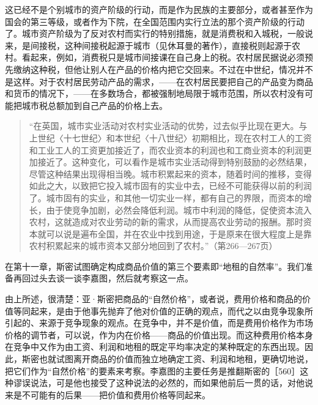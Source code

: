 这已经不是个别城市的资产阶级的行动，而是作为民族的主要部分，或者甚至作为国会的第三等级，或者作为下院，在全国范围内实行立法的那个资产阶级的行动了。城市资产阶级为了反对农村而实行的特别措施，就是消费税和入城税，一般说来，是间接税，这种间接税起源于城市（见休耳曼的著作），直接税则起源于农村。看起来，例如，消费税只是城市间接课在自己身上的税。农村居民据说必须预先缴纳这种税，但他让别人在产品的价格内把它交回来。不过在中世纪，情况并不是这样。对于农村居民劳动产品的需求，——在农村居民要把自己的产品变为商品和货币的情况下，——在多数场合，都被强制地局限于城市范围，所以农村没有可能把城市税总额加到自己产品的价格上去。

\begin{quote}{“在英国，城市实业活动对农村实业活动的优势，过去似乎比现在更大。与上世纪〈十七世纪〉和本世纪〈十八世纪〉初期相比，现在农村工人的工资和工业工人的工资更加接近了，而农业资本的利润也和工商业资本的利润更加接近了。这种变化，可以看作是城市实业活动得到特别鼓励的必然结果，尽管这种结果出现得相当晚。城市积累起来的资本，随着时间的推移，变得如此之大，以致把它投入城市固有的实业中去，已经不可能获得以前的利润了。城市固有的实业，和其他一切实业一样，都有自己的界限，而资本的增长，由于使竞争加剧，必然会降低利润。城市中利润的降低，促使资本流入农村，这就造成对农业劳动的新的需求，从而提高农业劳动的报酬。那时资本就可以说是遍布全国，并在农业中找到用途，于是原来在很大程度上是靠农村积累起来的城市资本又部分地回到了农村。”（第266—267页）}\end{quote}

在第十一章，斯密试图确定构成商品价值的第三个要素即“地租的自然率”。我们准备再回过头去谈一谈李嘉图，然后就考察这一点。

由上所述，很清楚：亚·斯密把商品的“自然价格”，或者说，费用价格和商品的价值等同起来，是由于他事先抛弃了他对价值的正确的观点，而代之以由竞争现象所引起的、来源于竞争现象的观点。在竞争中，并不是价值，而是费用价格作为市场价格的调节者，可以说，作为内在价格——商品的价值出现。而这种费用价格本身在竞争中又作为由工资、利润和地租的既定平均率决定的某种既定的东西出现。因此，斯密也就试图离开商品的价值而独立地确定工资、利润和地租，更确切地说，把它们作为“自然价格”的要素来考察。李嘉图的主要任务是推翻斯密的［560］这种谬误说法，可是他也接受了这种说法的必然的，而如果他前后一贯的话，对他说来是不可能有的后果——把价值和费用价格等同起来。



